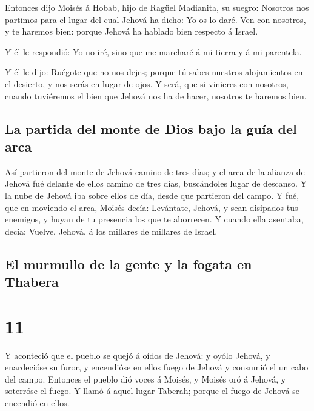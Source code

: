  Entonces dijo Moisés á Hobab, hijo de Ragüel Madianita, su
suegro: Nosotros nos partimos para el lugar del cual Jehová ha dicho: Yo
os lo daré. Ven con nosotros, y te haremos bien: porque Jehová ha
hablado bien respecto á Israel.

 Y él le respondió: Yo no iré, sino que me marcharé á mi
tierra y á mi parentela.

 Y él le dijo: Ruégote que no nos dejes; porque tú sabes
nuestros alojamientos en el desierto, y nos serás en lugar de ojos.
 Y será, que si vinieres con nosotros, cuando tuviéremos el
bien que Jehová nos ha de hacer, nosotros te haremos bien.

\hypertarget{la-partida-del-monte-de-dios-bajo-la-guuxeda-del-arca}{%
\subsection{La partida del monte de Dios bajo la guía del
arca}\label{la-partida-del-monte-de-dios-bajo-la-guuxeda-del-arca}}

 Así partieron del monte de Jehová camino de tres días; y
el arca de la alianza de Jehová fué delante de ellos camino de tres
días, buscándoles lugar de descanso.  Y la nube de Jehová
iba sobre ellos de día, desde que partieron del campo.  Y
fué, que en moviendo el arca, Moisés decía: Levántate, Jehová, y sean
disipados tus enemigos, y huyan de tu presencia los que te aborrecen.
 Y cuando ella asentaba, decía: Vuelve, Jehová, á los
millares de millares de Israel.

\hypertarget{el-murmullo-de-la-gente-y-la-fogata-en-thabera}{%
\subsection{El murmullo de la gente y la fogata en
Thabera}\label{el-murmullo-de-la-gente-y-la-fogata-en-thabera}}

\hypertarget{section-10}{%
\section{11}\label{section-10}}

 Y aconteció que el pueblo se quejó á oídos de Jehová: y
oyólo Jehová, y enardecióse su furor, y encendióse en ellos fuego de
Jehová y consumió el un cabo del campo.  Entonces el pueblo
dió voces á Moisés, y Moisés oró á Jehová, y soterróse el fuego.
 Y llamó á aquel lugar Taberah; porque el fuego de Jehová se
encendió en ellos.

